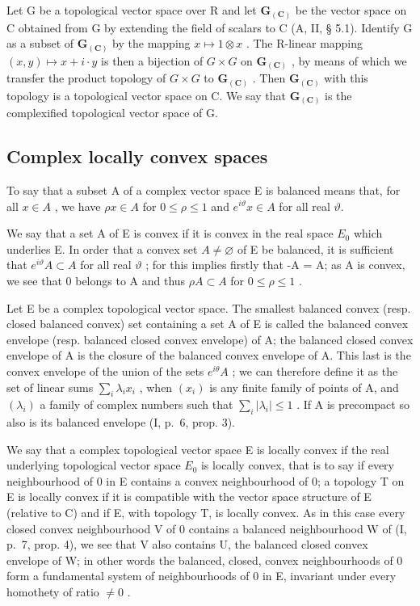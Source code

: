 Let G be a topological vector space over R and let \(\mathbf{G}_{(\mathbf{C})}\) be the vector space on C obtained from G by extending the field of scalars to C (A, II, § 5.1). Identify G as a subset of \(\mathbf{G}_{(\mathbf{C})}\) by the mapping \(x \mapsto 1 \otimes x\) . The R-linear mapping \((x, y) \mapsto x + i \cdot y\) is then a bijection of \(G \times G\) on \(\mathbf{G}_{(\mathbf{C})}\) , by means of which we transfer the product topology of \(G \times G\) to \(\mathbf{G}_{(\mathbf{C})}\) . Then \(\mathbf{G}_{(\mathbf{C})}\) with this topology is a topological vector space on C. We say that \(\mathbf{G}_{(\mathbf{C})}\) is the complexified topological vector space of G.

\subsection{Complex locally convex spaces}

To say that a subset A of a complex vector space E is balanced means that, for all \(x \in A\) , we have \(\rho x \in A\) for \(0 \leqslant \rho \leqslant 1\) and \(e^{i\vartheta}x \in A\) for all real \(\vartheta\).

We say that a set A of E is convex if it is convex in the real space \(E_{0}\) which underlies E. In order that a convex set \(A \neq \varnothing\) of E be balanced, it is sufficient that \(e^{i\vartheta}A \subset A\) for all real \(\vartheta\) ; for this implies firstly that -A = A; as A is convex, we see that 0 belongs to A and thus \(\rho A \subset A\) for \(0 \leqslant \rho \leqslant 1\) .

Let E be a complex topological vector space. The smallest balanced convex (resp. closed balanced convex) set containing a set A of E is called the balanced convex envelope (resp. balanced closed convex envelope) of A; the balanced closed convex envelope of A is the closure of the balanced convex envelope of A. This last is the convex envelope of the union of the sets \(e^{i\theta}A\) ; we can therefore define it as the set of linear sums \(\sum_{i}\lambda_{i}x_{i}\) , when \((x_{i})\) is any finite family of points of A, and \((\lambda_{i})\) a family of complex numbers such that \(\sum_{i}|\lambda_{i}| \leqslant 1\) . If A is precompact so also is its balanced envelope (I, p.~6, prop. 3).

We say that a complex topological vector space E is locally convex if the real underlying topological vector space \(E_{0}\) is locally convex, that is to say if every neighbourhood of 0 in E contains a convex neighbourhood of 0; a topology T on E is locally convex if it is compatible with the vector space structure of E (relative to C) and if E, with topology T, is locally convex. As in this case every closed convex neighbourhood V of 0 contains a balanced neighbourhood W of (I, p.~7, prop. 4), we see that V also contains U, the balanced closed convex envelope of W; in other words the balanced, closed, convex neighbourhoods of 0 form a fundamental system of neighbourhoods of 0 in E, invariant under every homothety of ratio \(\neq 0\) .

